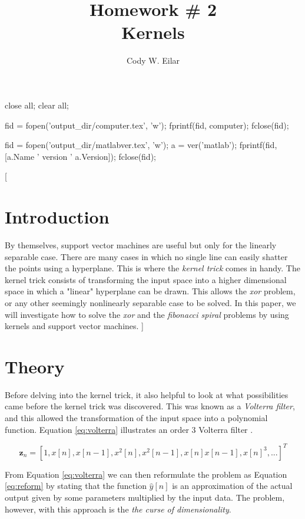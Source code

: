 \documentclass[11pt, twoside]{article}   	%
\title{Homework \# 2 \\ Kernels}
\author{Cody W. Eilar}
\newenvironment{matlab}{\comment}{\endcomment}
\begin{document}
\maketitle


\begin{matlab}
close all; 
clear all;

fid = fopen('output_dir/computer.tex', 'w'); 
fprintf(fid, computer); 
fclose(fid); 

fid = fopen('output_dir/matlabver.tex', 'w'); 
a = ver('matlab'); 
fprintf(fid, [a.Name ' version ' a.Version]); 
fclose(fid); 
\end{matlab}

[
\section{Introduction} 
By themselves, support vector machines are useful but only for the linearly separable case. There are many cases in which no single line can easily shatter the points 
using a hyperplane. This is where the \textit{kernel trick} comes in handy. The kernel trick consists of transforming the input space into a higher dimensional space in which a "linear"
hyperplane can be drawn. This allows the \textit{xor} problem, or any other seemingly nonlinearly separable case to be solved. In this paper, we will investigate how to solve the \textit{xor} 
and the \textit{fibonacci spiral} problems by using kernels and support vector machines. 
]

\section{Theory}
Before delving into the kernel trick, it also helpful to look at what possibilities came before the kernel trick was discovered. This was known as a \textit{Volterra filter}, and this allowed
the transformation of the input space into a polynomial function. Equation \ref{eq:volterra} illustrates an order 3 Volterra filter \cite{volterra}.


\begin{equation}
\mathbf{z}_n = [1, x[n], x[n-1], x^2[n], x^2[n-1], x[n] x[n-1], x[n]^3, ...]^T
\label{eq:volterra}
\end{equation}

From Equation \ref{eq:volterra} we can then reformulate the problem as Equation \ref{eq:reform} by stating that the function $\hat{y}[n]$ is an approximation of the actual output
given by some parameters multiplied by the input data. The problem, however, with this approach is the \textit{the curse of dimensionality}.
\end{document}
